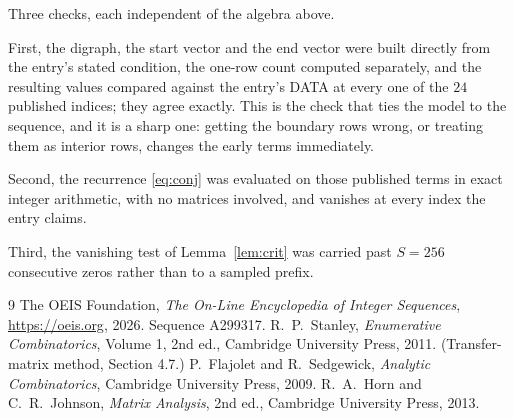 \documentclass[11pt,a4paper]{article}
\theoremstyle{plain}
\theoremstyle{definition}
\begin{document}
Three checks, each independent of the algebra above.

First, the digraph, the start vector and the end vector were built directly from the
entry's stated condition, the one-row count computed separately, and the resulting values
compared against the entry's DATA at every one of the $24$ published indices; they
agree exactly. This is the check that ties the model to the sequence, and it is a sharp one:
getting the boundary rows wrong, or treating them as interior rows, changes the early terms
immediately.

Second, the recurrence \eqref{eq:conj} was evaluated on those published terms in exact
integer arithmetic, with no matrices involved, and vanishes at every index the entry claims.

Third, the vanishing test of Lemma~\ref{lem:crit} was carried past $S=256$ consecutive
zeros rather than to a sampled prefix.

\begin{thebibliography}{9}
 The OEIS Foundation, \emph{The On-Line Encyclopedia of Integer
Sequences}, \url{https://oeis.org}, 2026. Sequence A299317.
 R.~P.~Stanley, \emph{Enumerative Combinatorics}, Volume 1, 2nd ed.,
Cambridge University Press, 2011. (Transfer-matrix method, Section 4.7.)
 P.~Flajolet and R.~Sedgewick, \emph{Analytic Combinatorics}, Cambridge
University Press, 2009.
 R.~A.~Horn and C.~R.~Johnson, \emph{Matrix Analysis}, 2nd ed., Cambridge
University Press, 2013.
\end{thebibliography}
\end{document}
